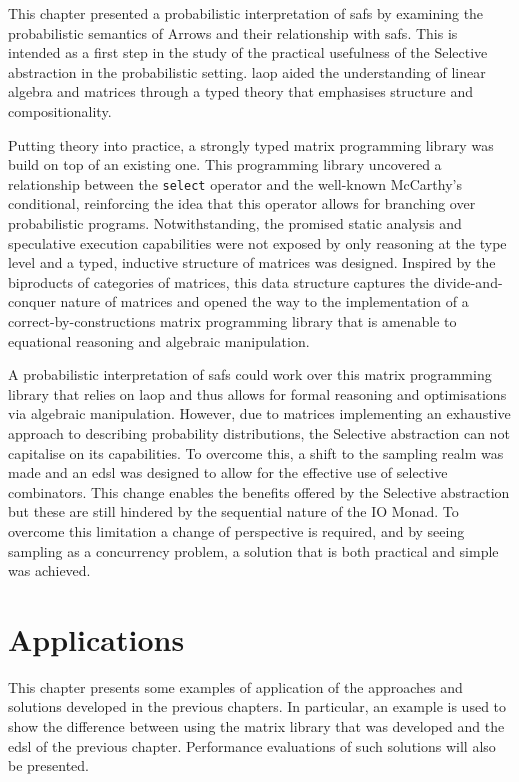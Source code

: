 \documentclass[
  oneside,
  11pt, a4paper,
  footinclude=true,
  headinclude=true,
  cleardoublepage=empty
]{scrbook}
\theoremstyle{definition}
\theoremstyle{definition}
\begin{document}
    This chapter presented a probabilistic interpretation of \glspl{saf} by examining the probabilistic semantics of Arrows and their relationship with \glspl{saf}. This is intended as a first step in the study of the practical usefulness of the Selective abstraction in the probabilistic setting. \gls{laop} aided the understanding of linear algebra and matrices through a typed theory that emphasises structure and compositionality.
    
    Putting theory into practice, a strongly typed matrix programming library was build on top of an existing one. This programming library uncovered a relationship between the \texttt{select} operator and the well-known McCarthy's conditional, reinforcing the idea that this operator allows for branching over probabilistic programs. Notwithstanding, the promised static analysis and speculative execution capabilities were not exposed by only reasoning at the type level and a typed, inductive structure of matrices was designed. Inspired by the biproducts of categories of matrices, this data structure captures the divide-and-conquer nature of matrices and opened the way to the implementation of a correct-by-constructions matrix programming library that is amenable to equational reasoning and algebraic manipulation. 
    
    A probabilistic interpretation of \glspl{saf} could work over this matrix programming library that relies on \gls{laop} and thus allows for formal reasoning and optimisations via algebraic manipulation. However, due to matrices implementing an exhaustive approach to describing probability distributions, the Selective abstraction can not capitalise on its capabilities. To overcome this, a shift to the sampling realm was made and an \gls{edsl} was designed to allow for the effective use of selective combinators. This change enables the benefits offered by the Selective abstraction but these are still hindered by the sequential nature of the IO Monad. To overcome this limitation a change of perspective is required, and by seeing sampling as a concurrency problem, a solution that is both practical and simple was achieved.
    
    \chapter{Applications}\label{ch-applications}
   
    This chapter presents some examples of application of the approaches and solutions developed in the previous chapters. In particular, an example is used to show the difference between using the matrix library that was developed and the \gls{edsl} of the previous chapter. Performance evaluations of such solutions will also be presented.
    
\end{document}
